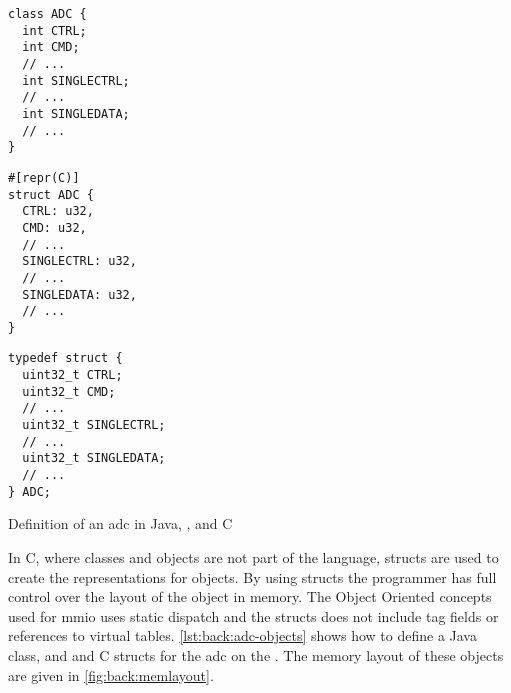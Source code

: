 \begin{listing}[H]
  \centering
  \begin{minipage}{0.31\textwidth}
  \begin{listing}
    \begin{verbatim}
class ADC {
  int CTRL;
  int CMD;
  // ...
  int SINGLECTRL;
  // ...
  int SINGLEDATA;
  // ...
}
    \end{verbatim}
  \end{listing}
  \end{minipage}
  \hfill
  \begin{minipage}{0.31\textwidth}
  \begin{listing}
    \begin{verbatim}
#[repr(C)]
struct ADC {
  CTRL: u32,
  CMD: u32,
  // ...
  SINGLECTRL: u32,
  // ...
  SINGLEDATA: u32,
  // ...
}
    \end{verbatim}
  \end{listing}
  \end{minipage}
  \hfill
  \begin{minipage}{0.31\textwidth}
  \begin{listing}
    \begin{verbatim}
typedef struct {
  uint32_t CTRL;
  uint32_t CMD;
  // ...
  uint32_t SINGLECTRL;
  // ...
  uint32_t SINGLEDATA;
  // ...
} ADC;
    \end{verbatim}
  \end{listing}
  \end{minipage}

  \caption{Definition of an \gls{adc} in Java, \rust, and C}
  \label{lst:back:adc-objects}
\end{listing}


In C, where classes and objects are not part of the language, structs are used to create the representations for objects.
By using structs the programmer has full control over the layout of the object in memory.
The Object Oriented concepts used for \gls{mmio} uses static dispatch and the structs does not include tag fields or references to virtual tables.
\autoref{lst:back:adc-objects} shows how to define a Java class, and \rust and C structs for the \gls{adc} on the \gecko.
The memory layout of these objects are given in \autoref{fig:back:memlayout}.

